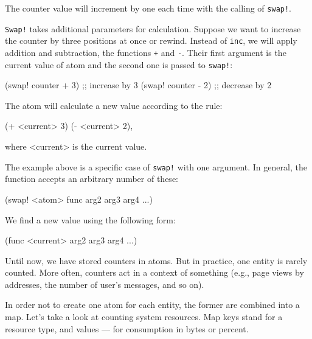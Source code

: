 \noindent
The counter value will increment by one each time with the calling of \verb|swap!|.

\verb|Swap!| takes additional parameters for calculation.
Suppose we want to increase the counter by three positions at once or rewind. Instead of \verb|inc|, we will apply addition and subtraction, the functions \verb|+| and \verb|-|.
Their first argument is the current value of atom and the second one is passed to \verb|swap!|:

\begin{english}
  \begin{clojure}
(swap! counter + 3) ;; increase by 3
(swap! counter - 2) ;; decrease by 2
  \end{clojure}
\end{english}

The atom will calculate a new value according to the rule:

\begin{english}
  \begin{clojure}
(+ <current> 3)
(- <current> 2),
  \end{clojure}
\end{english}

\noindent
where <current> is the current value.

The example above is a specific case of \verb|swap!| with one argument. In general, the function accepts an arbitrary number of these:

\begin{english}
  \begin{clojure}
(swap! <atom> func arg2 arg3 arg4 ...)
  \end{clojure}
\end{english}

\noindent
We find a new value using the following form:

\begin{english}
  \begin{clojure}
(func <current> arg2 arg3 arg4 ...)
  \end{clojure}
\end{english}

Until now, we have stored counters in atoms.
But in practice, one entity is rarely counted.
More often, counters act in a context of something (e.g., page views by addresses, the number of user's messages, and so on).

In order not to create one atom for each entity, the former are combined into a map.
Let’s take a look at counting system resources.
Map keys stand for a resource type, and values — for consumption in bytes or percent.

